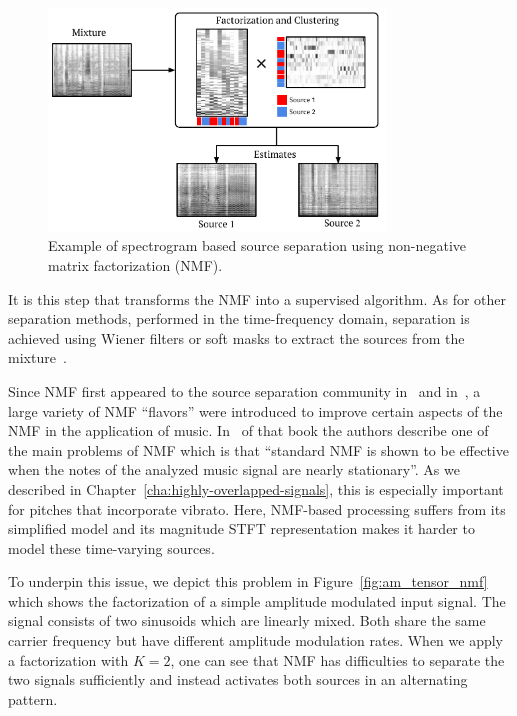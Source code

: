 \begin{figure}[h]
  \centering
  \includegraphics[width=0.8\textwidth]{Chapters/06_Separation_Unknown/figures/nmf_separation.pdf}
  \caption{Example of spectrogram based source separation using non-negative matrix factorization (NMF).}
  \label{fig:nmf_separation}
\end{figure}

It is this step that transforms the NMF into a supervised algorithm.
As for other separation methods, performed in the time-frequency domain, separation is achieved using Wiener filters or soft masks to extract the sources from the mixture~\cite{liutkus15c}.
\par
Since NMF first appeared to the source separation community in~\cite{smaragdis03} and in~\cite{vembu05}, a large variety of NMF ``flavors'' were introduced to improve certain aspects of the NMF in the application of music. 
In~\cite[Chapter 16]{vincent} of that book the authors describe one of the main problems of NMF which is that ``standard NMF is shown to be effective when the notes of the analyzed music signal are nearly stationary''.
As we described in Chapter~\ref{cha:highly-overlapped-signals}, this is especially important for pitches that incorporate vibrato.
Here, NMF-based processing suffers from its simplified model and its magnitude STFT representation makes it harder to model these time-varying sources.
\par
To underpin this issue, we depict this problem in Figure~\ref{fig:am_tensor_nmf} which shows the factorization of a simple amplitude modulated input signal. 
The signal consists of two sinusoids which are linearly mixed. 
Both share the same carrier frequency but have different amplitude modulation rates. 
When we apply a factorization with $K=2$, one can see that NMF has difficulties to separate the two signals sufficiently and instead activates both sources in an alternating pattern.

